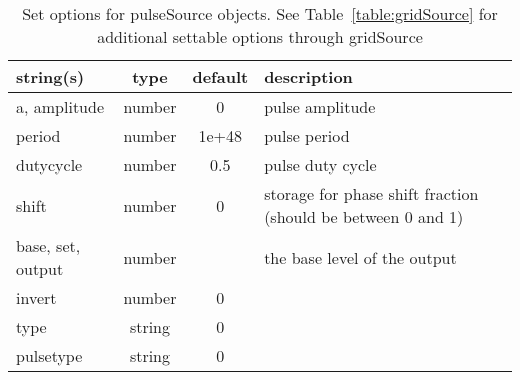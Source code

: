 \begin{table}[ht]
\centering
\begin{tabular}{p{5cm} c c p{7cm}}
\hline
string(s) & type & default & description \\
\hline
a, amplitude & number & 0 & pulse amplitude\\
period & number & 1e+48 & pulse period\\
dutycycle & number & 0.5 & pulse duty cycle\\
shift & number & 0 & storage for phase shift fraction (should be between 0 and 1)\\
base, set, output & number &  & the base level of the output\\
invert & number & 0 & \\
type & string & 0 & \\
pulsetype & string & 0 & \\
\hline
\end{tabular}
\caption{Set options for pulseSource objects. See Table~\ref{table:gridSource} for additional settable options through gridSource}
\label{table:pulseSource}
\end{table}

